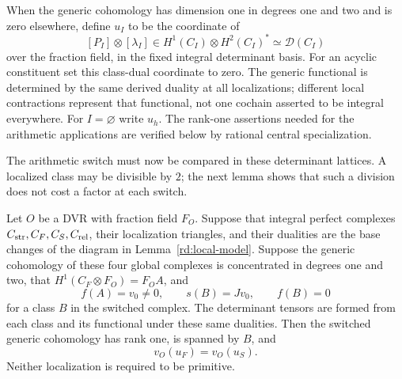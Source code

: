 When the generic cohomology has dimension one in degrees one and
two and is zero elsewhere, define \(u_I\) to be the coordinate of
\[
 [P_I]\otimes[\lambda_I]\in
 H^1(C_I)\otimes H^2(C_I)^*
       \simeq\mathcal D(C_I)
\]
over the fraction field, in the fixed integral determinant basis.
For an acyclic constituent set this class-dual coordinate to zero.
The generic functional is determined by the same derived duality
at all localizations; different local contractions represent that
functional, not one cochain asserted to be integral everywhere.
For \(I=\varnothing\) write \(u_h\).  The rank-one assertions
needed for the arithmetic applications are verified below by
rational central specialization.

The arithmetic switch must now be compared in these determinant
lattices.  A localized class may be divisible by \(2\); the next
lemma shows that such a division does not cost a factor at each switch.

\begin{lemma}\label{rd:det-switch}
Let \(O\) be a DVR with fraction field \(F_O\).  Suppose that integral
perfect complexes \(C_{\rm str},C_F,C_S,C_{\rm rel}\), their
localization triangles, and their dualities are the base changes of
the diagram in Lemma~\ref{rd:local-model}.  Suppose the generic cohomology of these four global complexes is
concentrated in degrees one and two, that
\(H^1(C_F\otimes F_O)=F_OA\), and
\[
 f(A)=v_0\ne0,\qquad s(B)=Jv_0,\qquad f(B)=0
\]
for a class \(B\) in the switched complex.  The determinant tensors
are formed from each class and its functional under these same
dualities.  Then the switched generic cohomology has rank one,
is spanned by \(B\), and
\begin{equation}
 v_O(u_F)=v_O(u_S).
 \label{rd:valuation-switch}
\end{equation}
Neither localization is required to be primitive.
\end{lemma}

